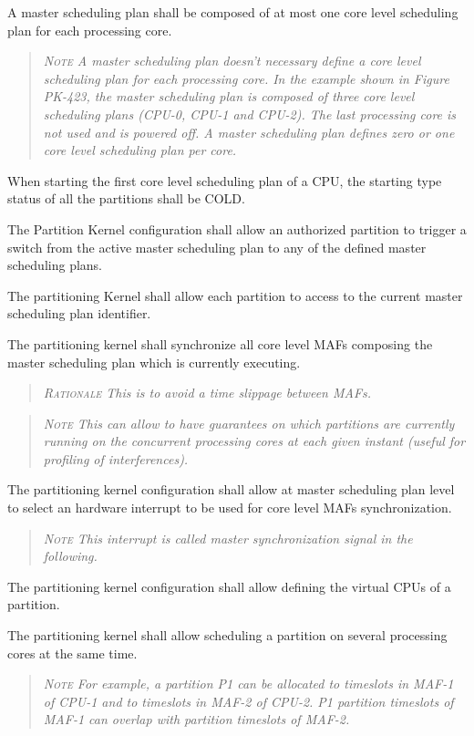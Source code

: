 A master scheduling plan shall be composed of at most one core level scheduling plan for each processing core.
\begin{quote}\it
\textsc{Note}
A master scheduling plan doesn't necessary define a core level scheduling plan for each processing core. In the example shown in Figure PK-423, the master scheduling plan is composed of three core level scheduling plans (CPU-0, CPU-1 and CPU-2). The last processing core is not used and is powered off. A master scheduling plan defines zero or one core level scheduling plan per core.
\end{quote}

When starting the first core level scheduling plan of a CPU, the starting type status of all the partitions shall be COLD.

The Partition Kernel configuration shall allow an authorized partition to trigger a switch from the active master scheduling plan to any of the defined master scheduling plans.

The partitioning Kernel shall allow each partition to access to the current master scheduling plan identifier.

The partitioning kernel shall synchronize all core level MAFs composing the master scheduling plan which is currently executing.
\begin{quote}\it
\textsc{Rationale}
This is to avoid a time slippage between MAFs.
\end{quote}
\begin{quote}\it
\textsc{Note}
This can allow to have guarantees on which partitions are currently running on the concurrent processing cores at each given instant (useful for profiling of interferences).
\end{quote}

The partitioning kernel configuration shall allow at master scheduling plan level to select an hardware interrupt to be used for core level MAFs synchronization.
\begin{quote}\it
\textsc{Note}
This interrupt is called master synchronization signal in the following.
\end{quote}

The partitioning kernel configuration shall allow defining the virtual CPUs of a partition.

The partitioning kernel shall allow scheduling a partition on several processing cores at the same time.
\begin{quote}\it
\textsc{Note}
For example, a partition P1 can be allocated to timeslots in MAF-1 of CPU-1 and to timeslots in MAF-2 of CPU-2. P1 partition timeslots of MAF-1 can overlap with partition timeslots of MAF-2.
\end{quote}

